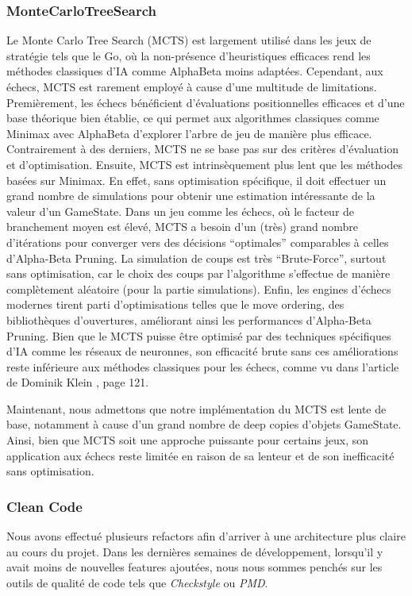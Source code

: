 \documentclass{article}
\begin{document}
\subsubsection{MonteCarloTreeSearch}
Le Monte Carlo Tree Search (MCTS) est largement utilisé dans les jeux de stratégie tels que le Go, où la non-présence d'heuristiques efficaces rend les méthodes classiques d'IA comme
AlphaBeta moins adaptées. Cependant, aux échecs, MCTS est rarement employé à cause d'une multitude de limitations.
Premièrement, les échecs bénéficient d'évaluations positionnelles efficaces et d'une base théorique bien établie, ce qui permet aux algorithmes classiques 
comme Minimax avec AlphaBeta d'explorer l'arbre de jeu de manière plus efficace. Contrairement à des derniers, MCTS ne se base pas sur des critères 
d'évaluation et d'optimisation. Ensuite, MCTS est intrinsèquement plus lent que les méthodes basées sur Minimax. En effet, sans optimisation spécifique, 
il doit effectuer un grand nombre de simulations pour obtenir une estimation intéressante de la valeur d'un GameState. Dans un jeu comme les échecs, où le 
facteur de branchement moyen est élevé, MCTS a besoin d'un (très) grand nombre d'itérations pour converger vers des décisions ``optimales'' comparables à 
celles d'Alpha-Beta Pruning. La simulation de coups est très ``Brute-Force'', surtout sans optimisation, car le choix des coups par l'algorithme s'effectue 
de manière complètement aléatoire (pour la partie simulations).
Enfin, les engines d'échecs modernes tirent parti d'optimisations telles que le move ordering, des bibliothèques d'ouvertures, améliorant ainsi les 
performances d'Alpha-Beta Pruning. Bien que le MCTS puisse être optimisé par des techniques spécifiques d'IA comme les réseaux de neuronnes, son 
efficacité brute sans ces améliorations reste inférieure aux méthodes classiques pour les échecs, comme vu dans l'article de Dominik Klein \cite{NNChess}, 
page 121. 

Maintenant, nous admettons que notre implémentation du MCTS est
lente de base, notamment à cause d'un grand nombre de deep copies d'objets GameState.
Ainsi, bien que MCTS soit une approche puissante pour certains jeux, son application aux échecs reste limitée en raison de sa lenteur et de son inefficacité 
sans optimisation.

\subsubsection{Clean Code}
Nous avons effectué plusieurs refactors afin d'arriver à une architecture plus claire au cours du projet. Dans les dernières semaines de développement,
lorsqu'il y avait moins de nouvelles features ajoutées, nous nous sommes penchés sur les outils de qualité de code tels que \textit{Checkstyle} ou \textit{PMD}.
\end{document}
